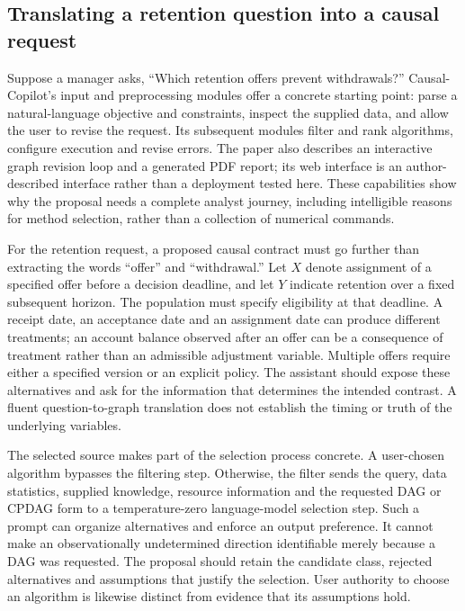 \subsection{Translating a retention question into a causal request}

Suppose a manager asks, ``Which retention offers prevent withdrawals?''
Causal-Copilot's input and preprocessing modules offer a concrete starting
point: parse a natural-language objective and constraints, inspect the supplied
data, and allow the user to revise the request. Its subsequent modules filter
and rank algorithms, configure execution and revise errors. The paper also
describes an interactive graph revision loop and a generated PDF report;
its web interface is an author-described interface rather than a deployment
tested here. These capabilities show why the proposal needs a complete
analyst journey, including intelligible reasons for method selection, rather
than a collection of numerical commands.~\citep{exec17_copilot_paper}

For the retention request, a proposed causal contract must go further than
extracting the words ``offer'' and ``withdrawal.'' Let $X$ denote assignment of
a specified offer before a decision deadline, and let $Y$ indicate retention
over a fixed subsequent horizon. The population must specify eligibility at
that deadline. A receipt date, an acceptance date and an assignment date can
produce different treatments; an account balance observed after an offer can
be a consequence of treatment rather than an admissible adjustment variable.
Multiple offers require either a specified version or an explicit policy.
The assistant should expose these alternatives and ask for the information
that determines the intended contrast. A fluent question-to-graph translation
does not establish the timing or truth of the underlying variables.

The selected source makes part of the selection process concrete. A user-chosen
algorithm bypasses the filtering step. Otherwise, the filter sends the query,
data statistics, supplied knowledge, resource information and the requested
DAG or CPDAG form to a temperature-zero language-model selection step. Such a
prompt can organize alternatives and enforce an output preference. It cannot
make an observationally undetermined direction identifiable merely because a
DAG was requested. The proposal should retain the candidate class, rejected
alternatives and assumptions that justify the selection. User authority to
choose an algorithm is likewise distinct from evidence that its assumptions
hold.~\citep{exec17_copilot_code}

